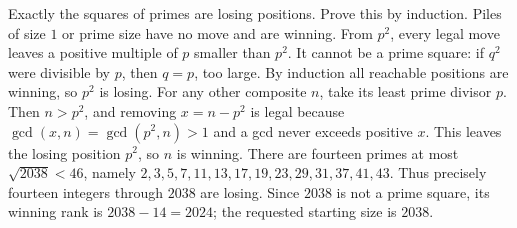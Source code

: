 Exactly the squares of primes are losing positions. Prove this by induction. Piles of size $1$ or prime size have no move and are winning. From $p^2$, every legal move leaves a positive multiple of $p$ smaller than $p^2$. It cannot be a prime square: if $q^2$ were divisible by $p$, then $q=p$, too large. By induction all reachable positions are winning, so $p^2$ is losing. For any other composite $n$, take its least prime divisor $p$. Then $n>p^2$, and removing $x=n-p^2$ is legal because $\gcd(x,n)=\gcd(p^2,n)>1$ and a gcd never exceeds positive $x$. This leaves the losing position $p^2$, so $n$ is winning. There are fourteen primes at most $\sqrt{2038}<46$, namely $2,3,5,7,11,13,17,19,23,29,31,37,41,43$. Thus precisely fourteen integers through $2038$ are losing. Since $2038$ is not a prime square, its winning rank is $2038-14=\boxed{2024}$; the requested starting size is $\boxed{2038}$.

